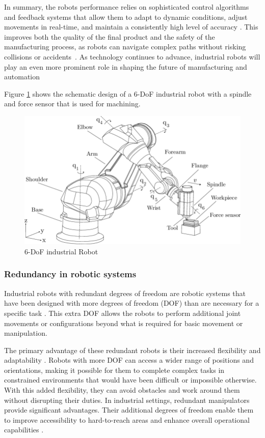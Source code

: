 In summary, the robots performance relies on sophisticated control algorithms and feedback systems that allow them to adapt to dynamic conditions, adjust movements in real-time, and maintain a consistently high level of accuracy \cite{Lin.2023}. This improves both the quality of the final product and the safety of the manufacturing process, as robots can navigate complex paths without risking collisions or accidents~\cite{Bosscher.2011}.
As technology continues to advance, industrial robots will play an even more prominent role in shaping the future of manufacturing and automation \cite{Domae.2019}


Figure \ref{robot} shows the schematic design of a 6-DoF industrial robot with a spindle and force sensor that is used for machining.

\begin{figure}[H]
	\centerline{\includegraphics[scale=.4]{figures/robot.png}}
	\caption{6-DoF industrial Robot \cite{HuynhHoaiNam.2018}}
	\label{robot}
\end{figure}


\subsubsection{Redundancy in robotic systems}

Industrial robots with redundant degrees of freedom are robotic systems that have been designed with more degrees of freedom (DOF) than are necessary for a specific task \cite{Liu.2022}. This extra DOF allows the robots to perform additional joint movements or configurations beyond what is required for basic movement or manipulation.

The primary advantage of these redundant robots is their increased flexibility and adaptability \cite{Duong.2021}. Robots with more DOF can access a wider range of positions and orientations, making it possible for them to complete complex tasks in constrained environments that would have been difficult or impossible otherwise. With this added flexibility, they can avoid obstacles and work around them without disrupting their duties. In industrial settings, redundant manipulators provide significant advantages. Their additional degrees of freedom enable them to improve accessibility to hard-to-reach areas and enhance overall operational capabilities \cite{Shi.2021}. 

